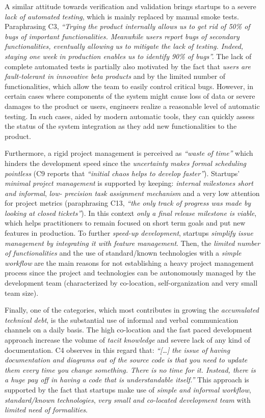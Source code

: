 \documentclass[10pt,journal,letterpaper,compsoc]{IEEEtran}
\begin{document}
A similar attitude towards verification and validation brings startups to a
severe \textit{lack of automated testing}, which is mainly replaced by manual
smoke tests. Paraphrasing C3, \textit{``Trying the product internally allows us 
to get rid of 50\% of bugs of important functionalities. Meanwhile users report 
bugs of secondary functionalities, eventually allowing us to mitigate the lack 
of testing. Indeed, staying one week in production enables us to identify 90\% 
of bugs''.} The lack of complete automated tests is partially also motivated by 
the fact that \textit{users are fault-tolerant in innovative beta products} and 
by the limited number of functionalities, which allow the team to easily control
critical bugs. However, in certain cases where components of the system might
cause loss of data or severe damages to the product or users, engineers realize
a reasonable level of automatic testing. In such cases, aided by modern
automatic tools, they can quickly assess the status of the system integration as
they add new functionalities to the product.

Furthermore, a rigid project management is perceived as \textit{``waste of
time''} which hinders the development speed since the \textit{uncertainty makes
formal scheduling pointless} (C9 reports that \textit{``initial chaos helps to
develop faster''}). Startups' \textit{minimal project management} is supported
by keeping: \textit{internal milestones short and informal}, \textit{low-
precision task assignment mechanism} and a very low attention for project
metrics (paraphrasing C13, \textit{``the only track of progress was made by
looking at closed tickets''}). In this context \textit{only a final release
milestone is viable}, which helps practitioners to remain focused on short term
goals and put new features in production. To further \textit{speed-up
development}, startups \textit{simplify issue management by integrating it with
feature management}. Then, the \textit{limited number of functionalities} and
the {use of standard/known technologies} with a \textit{simple workflow} are the
main reasons for not establishing a heavy project management process since the
project and technologies can be autonomously managed by the development team
(characterized by co-location, self-organization and very small team
size).  %

Finally, one of the categories, which most contributes in growing the
\textit{accumulated technical debt}, is the substantial use of informal and
verbal communication channels on a daily basis. The high co-location and the
fast paced development approach increase the volume of \textit{tacit knowledge}
and severe lack of any kind of documentation. C4 observes in this regard that:
\textit{``[\ldots] the issue of having documentation and diagrams out of the
source code is that you need to update them every time you change something.
There is no time for it. Instead, there is a huge pay off in having a code that
is understandable itself.''} This approach is supported by the fact that
startups make use of \textit{simple and informal workflow},
\textit{standard/known technologies}, \textit{very small and co-located
development team} with \textit{limited need of formalities}.
\end{document}
